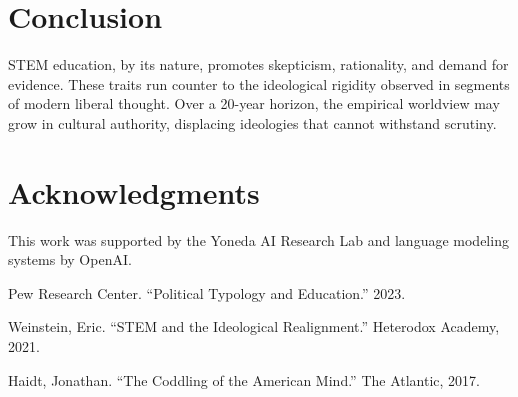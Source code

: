 \documentclass[11pt]{article}
\begin{document}
\section{Conclusion}
STEM education, by its nature, promotes skepticism, rationality, and demand for evidence. These traits run counter to the ideological rigidity observed in segments of modern liberal thought. Over a 20-year horizon, the empirical worldview may grow in cultural authority, displacing ideologies that cannot withstand scrutiny.

\section*{Acknowledgments}
This work was supported by the Yoneda AI Research Lab and language modeling systems by OpenAI.


\begin{thebibliography}{9}

 Pew Research Center. ``Political Typology and Education.'' 2023.

 Weinstein, Eric. ``STEM and the Ideological Realignment.'' Heterodox Academy, 2021.

 Haidt, Jonathan. ``The Coddling of the American Mind.'' The Atlantic, 2017.

\end{thebibliography}
\end{document}
